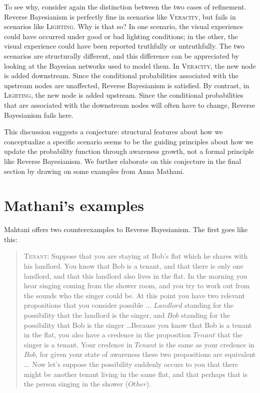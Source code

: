 \documentclass[
  11pt,
  dvipsnames,enabledeprecatedfontcommands]{scrartcl}
\begin{document}
To see why, consider again the distinction between the two cases of
refinement. Reverse Bayesianism is perfectly fine in scenarios like
\textsc{Veracity}, but fails in scenarios like \textsc{Lighting}. Why is
that so? In one scenario, the visual experience could have occurred
under good or bad lighting conditions; in the other, the visual
experience could have been reported truthfully or untruthfully. The two
scenarios are structurally different, and this difference can be
appreciated by looking at the Bayesian networks used to model them. In
\textsc{Veracity}, the new node is added downstream. Since the
conditional probabilities associated with the upstream nodes are
unaffected, Reverse Bayesianism is satisfied. By contrast, in
\textsc{Lighting}, the new node is added upstream. Since the conditional
probabilities that are associated with the downstream nodes will often
have to change, Reverse Bayesianism fails here.

This discussion suggests a conjecture: structural features about how we
conceptualize a specific scenario seems to be the guiding principles
about how we update the probability function through awareness growth,
not a formal principle like Reverse Bayesianism. We further elaborate on
this conjecture in the final section by drawing on some examples from
Anna Mathani.

\hypertarget{mathanis-examples}{%
\section{Mathani's examples}\label{mathanis-examples}}

\label{sec:mathani}

Mahtani offers two counterexamples to Reverse Bayesianism. The first
goes like this:

\begin{quote}
\textsc{Tenant}: Suppose that you are staying at Bob's flat which he shares with his landlord. You know
that Bob is a tenant, and that there is only one landlord, and that this landlord also
lives in the flat. In the morning you hear singing coming from the shower room, and
you try to work out from the sounds who the singer could be. At this point you have
two relevant propositions that you consider possible ... $Landlord$ standing for the possibility that the landlord is the singer, and $Bob$ standing for the possibility that Bob is the singer  \dots  Because you know that Bob is a tenant in the flat, you also have a credence in the proposition $Tenant$ that the singer is a tenant. Your credence in $Tenant$ is the same as your credence in $Bob$, for given your state of awareness these two propositions are equivalent ... Now let's suppose the possibility suddenly occurs to you that there might be another tenant living in the same flat, and that perhaps that is the person singing in the shower ($Other$).
\end{quote}
\end{document}

